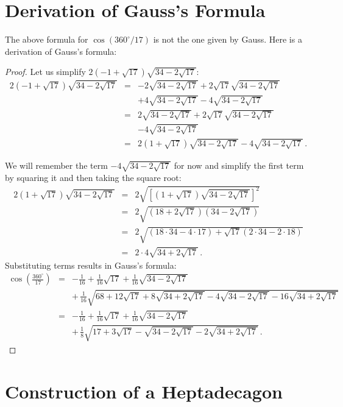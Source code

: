 \section{Derivation of Gauss's Formula}\label{s.derivation}

The above formula for $\cos(360^\circ /17)$ is not the one given by Gauss. Here is a derivation of Gauss's formula:
\begin{proof}
Let us simplify $2(-1+\sqrt{17})\sqrt{34-2\sqrt{17}}$:
%
\begin{eqnarray*}
2(-1+\sqrt{17})\sqrt{34-2\sqrt{17}} &=&
-2\sqrt{34-2\sqrt{17}} +2\sqrt{17}\sqrt{34-2\sqrt{17}}\\
&&+4\sqrt{34-2\sqrt{17}}-4\sqrt{34-2\sqrt{17}}\\
&=&
2\sqrt{34-2\sqrt{17}} +2\sqrt{17}\sqrt{34-2\sqrt{17}}\\
&&-4\sqrt{34-2\sqrt{17}}\\
&=&2(1+\sqrt{17})\sqrt{34-2\sqrt{17}}-4\sqrt{34-2\sqrt{17}}\,.
\end{eqnarray*}

\newpage

We will remember the term $-4\sqrt{34-2\sqrt{17}}$ for now and simplify the first term by squaring it and then taking the square root:
\begin{eqnarray*}
2(1+\sqrt{17})\sqrt{34-2\sqrt{17}}&=&
2\sqrt{\left[(1+\sqrt{17})\sqrt{34-2\sqrt{17}}\right]^2}\\
&=&2\sqrt{(18+2\sqrt{17})(34-2\sqrt{17})}\\
&=&2\sqrt{(18\cdot 34-4\cdot17)+\sqrt{17}(2\cdot 34 - 2\cdot 18)}\\
&=&2\cdot 4\sqrt{34+2\sqrt{17}}\,.
\end{eqnarray*}
Substituting terms results in Gauss's formula:
\begin{eqnarray*}
\cos\left(\frac{360^\circ}{17}\right) &=&
-\frac{1}{16}+\frac{1}{16}\sqrt{17} + 
     \frac{1}{16}\sqrt{34-2\sqrt{17}} \\
    &&
     +\,\frac{1}{16}\sqrt{
     68+12\sqrt{17} + 
     8\sqrt{34+2\sqrt{17}}-4\sqrt{34-2\sqrt{17}}
   -16
     \sqrt{34+2\sqrt{17}}
   }\\
&=&-\frac{1}{16}+\frac{1}{16}\sqrt{17} + 
     \frac{1}{16}\sqrt{34-2\sqrt{17}}\\
&&+\,\frac{1}{8}\sqrt{
     17+3\sqrt{17} - 
     \sqrt{34-2\sqrt{17}}
   -2
     \sqrt{34+2\sqrt{17}}
   }\,.
\end{eqnarray*}
\end{proof}

\section{Construction of a Heptadecagon}\label{s.construction}

